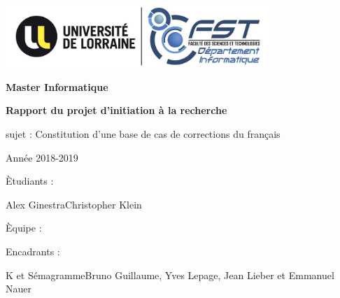 \documentclass{article}
\begin{document}
\begin{center}
\includegraphics[width=10cm]{logoULFST.jpg} %
\end{center}

\begin{center}
\thispagestyle{empty}
{\bfseries \large Master Informatique}
\end{center}

\vspace*{70mm}
\begin{center}
	{\bfseries \Huge Rapport du projet d'initiation \`{a} la recherche}
\end{center}
\vspace*{10mm}
\begin{center}
{\large sujet : Constitution d'une base de cas de corrections du fran\c{c}ais}
\end{center}
\begin{center}
{\large Ann\'ee 2018-2019}
\end{center}



\vspace*{60mm}
\begin{multicols}{2}
\begin{multicols}{2}
	\begin{flushright}
		\`{E}tudiants :
	\end{flushright}
		\vfill\null\columnbreak
	\begin{flushleft}
		Alex Ginestra\newline Christopher Klein
	\end{flushleft}
\end{multicols}
\vfill\null\columnbreak
\begin{multicols}{2}
	\begin{flushright}
		\`{E}quipe :
	\end{flushright}
	\begin{flushright}
		Encadrants :
	\end{flushright}
	\vfill\null\columnbreak
	\begin{flushleft}
	K et S\'emagramme\newline Bruno Guillaume, Yves Lepage, Jean Lieber et Emmanuel Nauer
	\end{flushleft}
\end{multicols}
\end{multicols}
\cleardoublepage
\cleardoublepage
\end{document}
